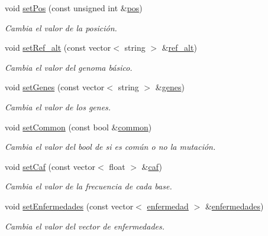 \begin{DoxyCompactItemize}
void \hyperlink{classmutacion_a2667189a28d3ac983a8f63ca92e81fba}{set\-Pos} (const unsigned int \&\hyperlink{classmutacion_ae1487b8648d0eaad68de5e4e5a87f3ff}{pos})
\begin{DoxyCompactList}\small\item\em Cambia el valor de la posición. \end{DoxyCompactList}\item 
void \hyperlink{classmutacion_a66b8d594a0bddbe4262f7a13ef551d07}{set\-Ref\-\_\-alt} (const vector$<$ string $>$ \&\hyperlink{classmutacion_abeb13e023fc9a34120106bccf58d5086}{ref\-\_\-alt})
\begin{DoxyCompactList}\small\item\em Cambia el valor del genoma básico. \end{DoxyCompactList}\item 
void \hyperlink{classmutacion_a91fd0ad088ac82897ccad36598b43830}{set\-Genes} (const vector$<$ string $>$ \&\hyperlink{classmutacion_a65fb9e2186d1c54d490289661b141aa1}{genes})
\begin{DoxyCompactList}\small\item\em Cambia el valor de los genes. \end{DoxyCompactList}\item 
void \hyperlink{classmutacion_ab62d36e9bad78d43ace74fdaec909ca6}{set\-Common} (const bool \&\hyperlink{classmutacion_a6dabfef6167d64030f095887b15f65dd}{common})
\begin{DoxyCompactList}\small\item\em Cambia el valor del bool de si es común o no la mutación. \end{DoxyCompactList}\item 
void \hyperlink{classmutacion_a52b79ec257cc96ad5c38a34ac4f2e827}{set\-Caf} (const vector$<$ float $>$ \&\hyperlink{classmutacion_aeb2ac56009900d9319873d00ee80e090}{caf})
\begin{DoxyCompactList}\small\item\em Cambia el valor de la frecuencia de cada base. \end{DoxyCompactList}\item 
void \hyperlink{classmutacion_acaad50a2aab9f6df3994a491eab44a86}{set\-Enfermedades} (const vector$<$ \hyperlink{classenfermedad}{enfermedad} $>$ \&\hyperlink{classmutacion_a0decaa0406675999e766f913e6347d79}{enfermedades})
\begin{DoxyCompactList}\small\item\em Cambia el valor del vector de enfermedades. \end{DoxyCompactList}\item 

\end{DoxyCompactItemize}
